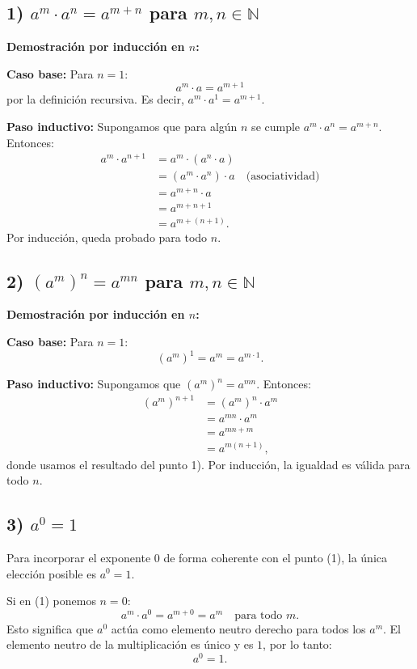 \documentclass{article}
\begin{document}
\subsection*{1) \(a^m \cdot a^n = a^{m+n}\) para \(m,n \in \mathbb{N}\)}

\textbf{Demostración por inducción en \(n\):}

\textbf{Caso base:} Para \(n=1\):
\[
a^m \cdot a = a^{m+1}
\]
por la definición recursiva. Es decir, \(a^m \cdot a^1 = a^{m+1}\).

\textbf{Paso inductivo:} Supongamos que para algún \(n\) se cumple \(a^m \cdot a^n = a^{m+n}\).  
Entonces:
\[
\begin{aligned}
a^m \cdot a^{n+1} 
&= a^m \cdot (a^n \cdot a) \\
&= (a^m \cdot a^n) \cdot a \quad \text{(asociatividad)} \\
&= a^{m+n} \cdot a \\
&= a^{m+n+1} \\
&= a^{m+(n+1)}.
\end{aligned}
\]
Por inducción, queda probado para todo \(n\).

\subsection*{2) \((a^m)^n = a^{mn}\) para \(m,n \in \mathbb{N}\)}

\textbf{Demostración por inducción en \(n\):}

\textbf{Caso base:} Para \(n=1\):
\[
(a^m)^1 = a^m = a^{m \cdot 1}.
\]

\textbf{Paso inductivo:} Supongamos que \((a^m)^n = a^{mn}\). Entonces:
\[
\begin{aligned}
(a^m)^{n+1} 
&= (a^m)^n \cdot a^m \\
&= a^{mn} \cdot a^m \\
&= a^{mn+m} \\
&= a^{m(n+1)},
\end{aligned}
\]
donde usamos el resultado del punto 1). Por inducción, la igualdad es válida para todo \(n\).

\subsection*{3) \(a^0 = 1\)}

Para incorporar el exponente \(0\) de forma coherente con el punto (1), la única elección posible es \(a^0 = 1\).

Si en (1) ponemos \(n=0\):
\[
a^m \cdot a^0 = a^{m+0} = a^m \quad \text{para todo } m.
\]
Esto significa que \(a^0\) actúa como elemento neutro derecho para todos los \(a^m\).  
El elemento neutro de la multiplicación es único y es \(1\), por lo tanto:
\[
a^0 = 1.
\]
\end{document}
